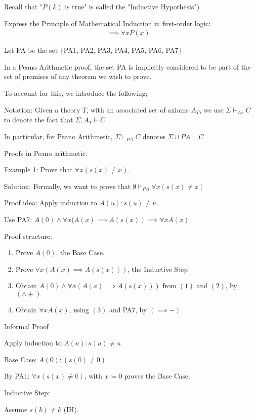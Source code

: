 \documentclass{article}
\begin{document}
Recall that "$P(k)$ is true" is called the "Inductive Hypothesis")

Express the Principle of Mathematical Induction in first-order logic:
\begin{align*}
[P(0) \wedge \forall x (P(x) \implies P(s(x))] \implies \forall x P(x)
\end{align*}

Let PA be the set $\{$PA1, PA2, PA3, PA4, PA5, PA6, PA7$\}$

In a Peano Arithmetic proof, the set PA is implicitly considered to be part of the set of premises of any theorem we wish to prove.

To account for this, we introduce the following;

Notation: Given a theory $T$, with an associated set of axioms $A_T$, we use $\Sigma \vdash_{A_T} C$ to denote the fact that $\Sigma, A_T \vdash C$

In particular, for Peano Arithmetic, $\Sigma \vdash_{PA}C$ denotes $\Sigma \cup P A \vdash C$

Proofs in Peano arithmetic.

Example 1: Prove that $\forall x (s(x) \ne x)$.

Solution: Formally, we want to prove that $\emptyset \vdash_{PA} \forall x (s(x) \ne x)$

Proof idea: Apply induction to $A(u): s(u) \ne u$.

Use PA7: $A(0) \wedge \forall x (A(x) \implies A(s(x)) \implies \forall x A(x)$

Proof structure:
\begin{enumerate}
    \item Prove $A(0)$, the Base Case.
    \item Prove $\forall x (A(x) \implies A(s(x)))$, the Inductive Step
    \item Obtain $A(0) \wedge \forall x  (A(x) \implies A(s(x)))$ from $(1)$ and $(2)$, by $(\wedge +)$
    \item Obtain $\forall x A(x)$, using $(3)$ and PA7, by $(\implies -)$
\end{enumerate}

Informal Proof

Apply induction to $A(u): s(u) \ne u$

Base Case: $A(0): (s(0) \ne 0)$

By PA1: $\forall x (s(x) \ne 0)$, with $x \coloneqq 0$ proves the Base Case.

Inductive Step:

Assume $s(k) \ne k$ (IH).
\end{document}
